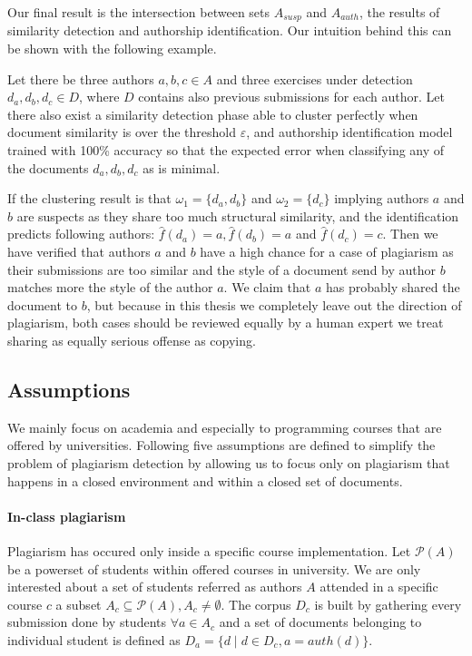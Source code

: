 Our final result is the intersection between sets $A_{susp}$ and $A_{auth}$, the results of similarity detection and authorship identification. Our intuition behind this can be shown with the following example. 

\begin{example}
Let there be three authors $a,b,c \in A$ and three exercises under detection $d_a, d_b, d_c \in D$, where $D$ contains also previous submissions for each author. Let there also exist a similarity detection phase able to cluster perfectly when document similarity is over the threshold $\varepsilon$, and authorship identification model trained with 100\% accuracy so that the expected error when classifying any of the documents $d_a, d_b, d_c$ as is minimal. 

If the clustering result is that $\omega_1 = \{d_a,d_b\}$ and $\omega_2 = \{d_c\}$ implying authors $a$ and $b$ are suspects as they share too much structural similarity, and the identification predicts following authors: $\hat{f}(d_a) = a, \hat{f}(d_b) = a$ and $\hat{f}(d_c) = c$. Then we have verified that authors $a$ and $b$ have a high chance for a case of plagiarism as their submissions are too similar and the style of a document send by author $b$ matches more the style of the author $a$. We claim that $a$ has probably shared the document to $b$, but because in this thesis we completely leave out the direction of plagiarism, both cases should be reviewed equally by a human expert \ie we treat sharing as equally serious offense as copying.
\end{example}




\subsection{Assumptions}

We mainly focus on academia and especially to programming courses that are offered by 
universities. Following five assumptions are defined to simplify the problem of plagiarism
detection by allowing us to focus only on plagiarism that happens in a closed environment and within a closed set of documents. 

\paragraph{In-class plagiarism} Plagiarism has occured only inside a 
specific course implementation. Let $\mathcal{P}(A)$ be a powerset of students within offered courses in university. We are only interested about a set of students referred as authors $A$ attended in a specific course $c$ \ie a subset $A_c \subseteq \mathcal{P}(A), A_c \neq \emptyset$. The corpus $D_c$ is built by gathering every submission done by students $\forall a \in A_c$ and a set of documents belonging to individual student is defined as $D_a = \{d \mid d \in D_c, a = auth(d)\}$. 


